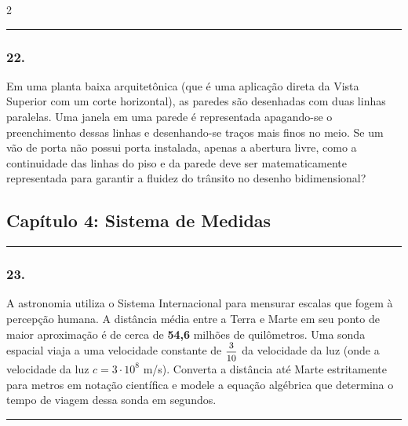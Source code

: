 \documentclass[twoside, 10pt, a4paper]{article}
\newlength{\espacoPosTitulo}\setlength{\espacoPosTitulo}{0.3cm}
\newlength{\espacoPreQuestao}\setlength{\espacoPreQuestao}{0.1cm}
\newlength{\espacoQuestao}\setlength{\espacoQuestao}{0.2cm}
\begin{document}
\begin{multicols*}{2}
\noindent\textcolor{CorLinha}{\rule{\linewidth}{0.5pt}} 
\par\vspace{\espacoPreQuestao}
\subsubsection*{22.} Em uma planta baixa arquitetônica (que é uma aplicação direta da Vista Superior com um corte horizontal), as paredes são desenhadas com duas linhas paralelas. Uma janela em uma parede é representada apagando-se o preenchimento dessas linhas e desenhando-se traços mais finos no meio. Se um vão de porta não possui porta instalada, apenas a abertura livre, como a continuidade das linhas do piso e da parede deve ser matematicamente representada para garantir a fluidez do trânsito no desenho bidimensional?
\par\vspace{\espacoQuestao}

\subsection*{Capítulo 4: Sistema de Medidas}
\vspace{-0.2cm}\noindent\rule{\linewidth}{1.5pt} 
\par\vspace{\espacoPosTitulo}
\subsubsection*{23.} A astronomia utiliza o Sistema Internacional para mensurar escalas que fogem à percepção humana. A distância média entre a Terra e Marte em seu ponto de maior aproximação é de cerca de \textbf{54,6} milhões de quilômetros. Uma sonda espacial viaja a uma velocidade constante de $ \mfrac{3}{10} $ da velocidade da luz (onde a velocidade da luz $c = 3 \cdot 10^8$ m/s). Converta a distância até Marte estritamente para metros em notação científica e modele a equação algébrica que determina o tempo de viagem dessa sonda em segundos.
\par\vspace{\espacoQuestao}

\noindent\textcolor{CorLinha}{\rule{\linewidth}{0.5pt}} 
\par\vspace{\espacoPreQuestao}

\end{multicols*}
\end{document}
